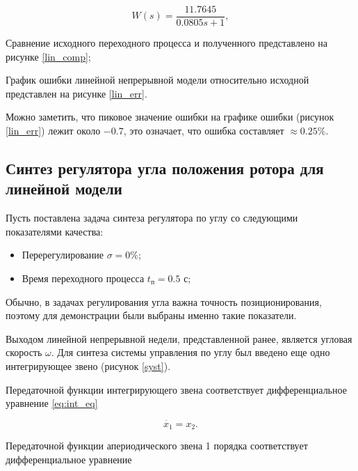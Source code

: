 \begin{equation}
  W(s)=\frac{11.7645}{0.0805s+1},
  \label{eq:lin_dbm}
\end{equation}

Сравнение исходного переходного процесса и полученного представлено на рисунке \ref{lin_comp};

\clearpage


График ошибки линейной непрерывной модели относительно исходной представлен на рисунке \ref{lin_err}.


Можно заметить, что пиковое значение ошибки на графике ошибки (рисунок \ref{lin_err})
лежит около $-0.7$, это означает, что ошибка составляет
$\approx0.25\%$.

\subsection{Синтез регулятора угла положения ротора для линейной модели}

Пусть поставлена задача синтеза регулятора по углу со следующими показателями качества:

\begin{itemize}
  \item Перерегулирование $\sigma = 0\%$;
  \item Время переходного процесса $t_{\text{п}}=0.5$ с;
\end{itemize}

Обычно, в задачах регулирования угла важна точность позиционирования, поэтому для демонстрации
были выбраны именно такие показатели.

Выходом линейной непрерывной недели, представленной ранее, является угловая скорость $\omega$.
Для синтеза системы управления по углу был введено еще одно интегрирующее 
звено (рисунок \ref{syst}).


Передаточной функции интегрирующего звена соответствует дифференциальное уравнение \ref{eq:int_eq}

\begin{equation}
  \dot{x_1}=x_2.
  \label{eq:int_eq}
\end{equation}

Передаточной функции апериодического звена 1 порядка соответствует дифференциальное уравнение

